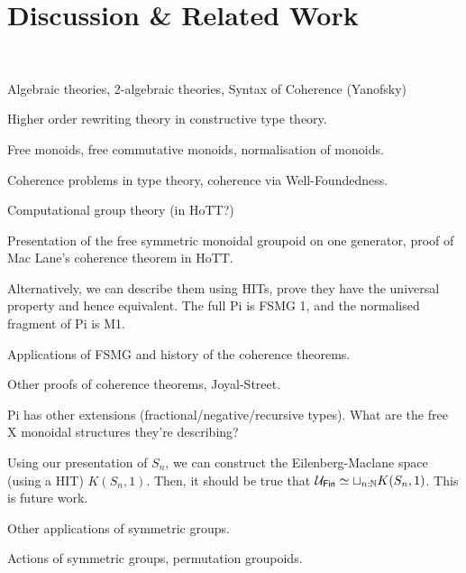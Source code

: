 \section{Discussion \& Related Work}~\label{sec:discussion}

Algebraic theories, 2-algebraic theories, Syntax of Coherence (Yanofsky)

Higher order rewriting theory in constructive type theory.

Free monoids, free commutative monoids, normalisation of monoids.

Coherence problems in type theory, coherence via Well-Foundedness.

Computational group theory (in HoTT?)

Presentation of the free symmetric monoidal groupoid on one generator, proof of Mac Lane's coherence theorem in HoTT.

Alternatively, we can describe them using HITs, prove they have the universal property and hence equivalent.
The full Pi is FSMG 1, and the normalised fragment of Pi is M1.

Applications of FSMG and history of the coherence theorems.

Other proofs of coherence theorems, Joyal-Street.

Pi has other extensions (fractional/negative/recursive types).
What are the free X monoidal structures they're describing?

Using our presentation of $S_{n}$, we can construct the Eilenberg-Maclane space (using a HIT) $K(S_{n},1)$. Then, it
should be true that $\UFin \eqv \sqcup_{n:\Nat} K(S_{n},1)$. This is future work.

Other applications of symmetric groups.

Actions of symmetric groups, permutation groupoids.

